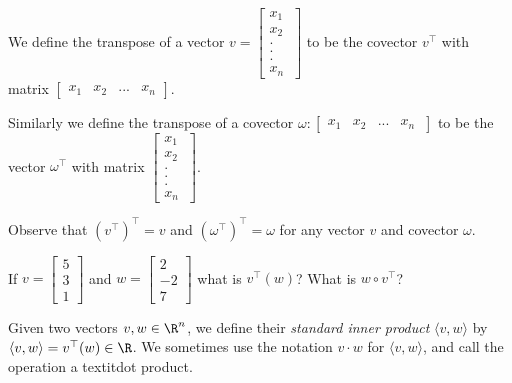 \begin{definition}
	We define the transpose of a vector $v = \begin{bmatrix} x_1 \\x_2\\ .\\.\\. \\ x_n\ \end{bmatrix}$ to be the covector $v^\top$ with matrix 
	$\begin{bmatrix} x_1 &x_2& ... &x_n \end{bmatrix}$.
	
	Similarly we define the transpose of a covector $\omega: \begin{bmatrix} x_1 &x_2& ... &x_n\ \end{bmatrix}$ to be the vector $\omega^\top$ with matrix
	$\begin{bmatrix} x_1 \\x_2\\ .\\.\\. \\ x_n\ \end{bmatrix}$.  
\end{definition}

Observe that $(v^\top)^\top = v$ and $(\omega^\top)^\top = \omega$ for any vector $v$ and covector $\omega$.

\begin{question}
	If $v = \begin{bmatrix}  5 \\ 3 \\ 1\end{bmatrix}$ and $w = \begin{bmatrix}  2 \\ -2 \\ 7\end{bmatrix}$ what is $v^\top(w)$? What is $w \circ v^\top$?
\end{question}

\begin{definition}
	Given two vectors $v,w \in \R^n$, we define their \textit{standard inner product} $\langle v, w\rangle$ by $\langle v,w \rangle = v^\top(w) \in \R$.  We sometimes use the notation 
	$v \cdot w$ for $\langle v , w \rangle$, and call the operation a textit{dot product}. 
\end{definition}


